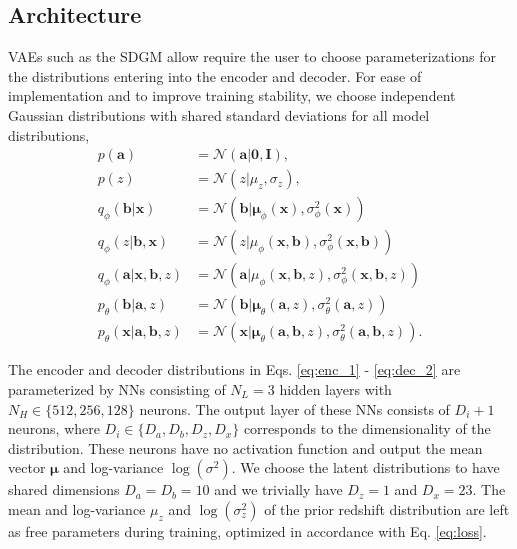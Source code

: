 
\subsection{Architecture}
\label{subsec:architecture}

VAEs such as the SDGM allow require the user to choose parameterizations for the distributions entering into the encoder and decoder. For ease of implementation and to improve training stability, we choose independent Gaussian distributions with shared standard deviations for all model distributions,
\begin{align}
    p(\mathbf{a}) &= \mathcal{N}(
        \mathbf{a|\mathbf{0}, \mathbf{I}}
    ), \\
    p(z) &= \mathcal{N}(
        z|\mu_z, \sigma_z
    ), \\
    q_\phi(\mathbf{b}|\mathbf{x}) &= \mathcal{N}(
        \mathbf{b}|\boldsymbol{\mu}_\phi(\mathbf{x}), \sigma^2_\phi(\mathbf{x})
    ) \label{eq:enc_1} \\
    q_\phi(z|\mathbf{b},\mathbf{x}) &= \mathcal{N}(
        z|\mu_\phi(\mathbf{x}, \mathbf{b}), \sigma^2_\phi(\mathbf{x}, \mathbf{b})
    )\\
    q_\phi(\mathbf{a} | \mathbf{x}, \mathbf{b}, z) &= \mathcal{N}(
        \mathbf{a}|\mu_\phi(\mathbf{x}, \mathbf{b}, z), \sigma^2_\phi(\mathbf{x}, \mathbf{b}, z)
    )\\
    p_\theta(\mathbf{b}|\mathbf{a}, z) &= \mathcal{N}(
        \mathbf{b}|\boldsymbol{\mu}_\theta(\mathbf{a}, z), \sigma^2_\theta(\mathbf{a}, z)
    ) \\
    p_\theta(\mathbf{x}|\mathbf{a}, \mathbf{b}, z) &= \mathcal{N}(
        \mathbf{x}|\boldsymbol{\mu}_\theta(\mathbf{a}, \mathbf{b}, z), \sigma^2_\theta(\mathbf{a}, \mathbf{b}, z)
    ). \label{eq:dec_2}
\end{align}

The encoder and decoder distributions in Eqs. \ref{eq:enc_1} - \ref{eq:dec_2} are parameterized by NNs consisting of $N_L=3$ hidden layers with $N_H\in \{512, 256, 128\}$ neurons. The output layer of these NNs consists of $D_i+1$ neurons, where $D_i \in \{D_a, D_b, D_z, D_x\}$ corresponds to the dimensionality of the distribution. These neurons have no activation function and output the mean vector $\boldsymbol{\mu}$ and log-variance $\log(\sigma^2)$. We choose the latent distributions to have shared dimensions $D_a = D_b = 10$ and we trivially have $D_z=1$ and $D_x=23$. The mean and log-variance $\mu_z$ and $\log(\sigma_z^2)$ of the prior redshift distribution are left as free parameters during training, optimized in accordance with Eq. \ref{eq:loss}. 

